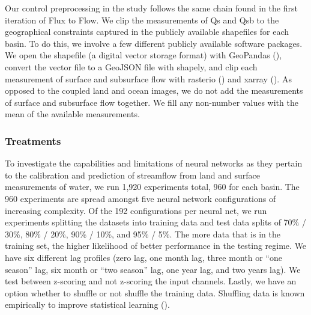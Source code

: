 \begin{refsection}
Our control preprocessing in the study follows the same chain found in the first iteration of Flux to Flow. We clip the measurements of Qs and Qsb to the geographical constraints captured in the publicly available shapefiles for each basin. To do this, we involve a few different publicly available software packages. We open the shapefile (a digital vector storage format) with GeoPandas (\cite{jordahl2020geopandas}), convert the vector file to a GeoJSON file with shapely, and clip each measurement of surface and subsurface flow with rasterio (\cite{gillies2019rasterio}) and xarray (\cite{hoyer2017xarray}). As opposed to the coupled land and ocean images, we do not add the measurements of surface and subsurface flow together. We fill any non-number values with the mean of the available measurements.

\subsubsection{Treatments}
To investigate the capabilities and limitations of neural networks as they pertain to the calibration and prediction of streamflow from land and surface measurements of water, we run 1,920 experiments total, 960 for each basin. The 960 experiments are spread amongst five neural network configurations of increasing complexity. Of the 192 configurations per neural net, we run experiments splitting the datasets into training data and test data splits of 70\% / 30\%, 80\% / 20\%, 90\% / 10\%, and 95\% / 5\%. The more data that is in the training set, the higher likelihood of better performance in the testing regime. We have six different lag profiles (zero lag, one month lag, three month or “one season” lag, six month or “two season” lag, one year lag, and two years lag). We test between z-scoring and not z-scoring the input channels. Lastly, we have an option whether to shuffle or not shuffle the training data. Shuffling data is known empirically to improve statistical learning (\cite{lee2017speeding}). 


\end{refsection}
